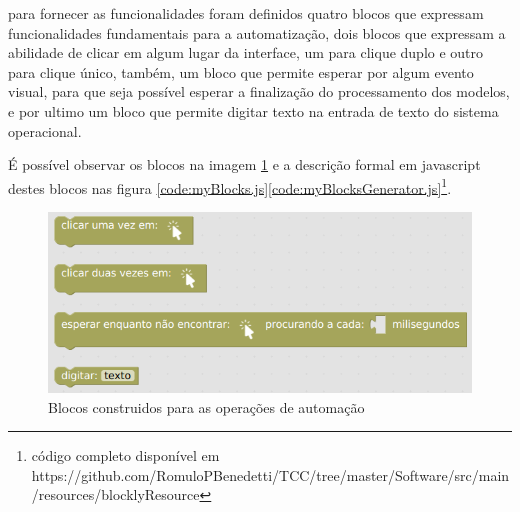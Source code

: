 \documentclass[tg]{mdtufsm}
\begin{document}
    para fornecer as funcionalidades foram definidos quatro blocos que expressam funcionalidades fundamentais para a automatização, dois blocos que expressam a abilidade de clicar em algum lugar da interface, um para clique duplo e outro para clique único, também, um bloco que permite esperar por algum evento visual, para que seja possível esperar a finalização do processamento dos modelos, e por ultimo um bloco que permite digitar texto na entrada de texto do sistema operacional.

    É possível observar os blocos na imagem \ref{fig:myblocks} e a descrição formal em javascript destes blocos nas figura \ref{code:myBlocks.js}\ref{code:myBlocksGenerator.js}\footnote{código completo disponível em https://github.com/RomuloPBenedetti/TCC/tree/master/Software/src/main/resources/blocklyResource}.

    \begin{figure}[!htb]
        {\centering
        \includegraphics[width=1.0\textwidth]{imagens/blocks.png}
        \caption{Blocos construidos para as operações de automação}
        \label{fig:myblocks}}
    \end{figure}
\end{document}

